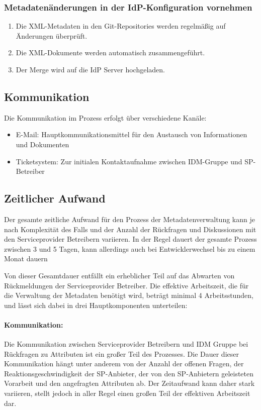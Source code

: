 \documentclass[a4paper, fontsize=11pt]{scrartcl}
\begin{document}
\subsubsection{Metadatenänderungen in der IdP-Konfiguration vornehmen}

\begin{enumerate}
  \item Die XML-Metadaten in den Git-Repositories werden regelmäßig auf Änderungen überprüft.
  \item Die XML-Dokumente werden automatisch zusammengeführt.
  \item Der Merge wird auf die IdP Server hochgeladen.
\end{enumerate}

\subsection{Kommunikation}
Die Kommunikation im Prozess erfolgt über verschiedene Kanäle:

\begin{itemize}
  \item E-Mail: Hauptkommunikationsmittel für den Austausch von Informationen und Dokumenten
  \item Ticketsystem: Zur initialen Kontaktaufnahme zwischen IDM-Gruppe und SP-Betreiber
\end{itemize}

\subsection{Zeitlicher Aufwand}

Der gesamte zeitliche Aufwand für den Prozess der Metadatenverwaltung kann je nach Komplexität des Falls und der Anzahl der Rückfragen und Diskussionen mit den Serviceprovider Betreibern variieren. 
In der Regel dauert der gesamte Prozess zwischen 3 und 5 Tagen, kann allerdings auch bei Entwicklerwechsel bis zu einem Monat dauern

Von dieser Gesamtdauer entfällt ein erheblicher Teil auf das Abwarten von Rückmeldungen der Serviceprovider Betreiber.
Die effektive Arbeitszeit, die für die Verwaltung der Metadaten benötigt wird, beträgt minimal 4 Arbeitsstunden, und lässt sich dabei in drei Hauptkomponenten unterteilen:

\paragraph{Kommunikation:}
Die Kommunikation zwischen Serviceprovider Betreibern und IDM Gruppe bei Rückfragen zu Attributen ist ein großer Teil des Prozesses.
Die Dauer dieser Kommunikation hängt unter anderem von der Anzahl der offenen Fragen, der Reaktionsgeschwindigkeit der SP-Anbieter, der von den SP-Anbietern geleisteten Vorarbeit und den angefragten Attributen ab. 
Der Zeitaufwand kann daher stark variieren, stellt jedoch in aller Regel einen großen Teil der effektiven Arbeitszeit dar.
\end{document}
